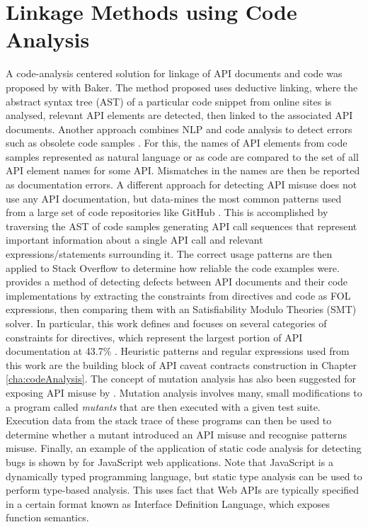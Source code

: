 \section{Linkage Methods using Code Analysis}
\label{sec:related-static-code-analysis}
A code-analysis centered solution for linkage of API documents and code was proposed by \cite{live-api-doc} with Baker. The method proposed uses deductive linking, where the abstract syntax tree (AST) of a particular code snippet from online sites is analysed, relevant API elements are detected, then linked to the associated API documents. Another approach combines NLP and code analysis to detect errors such as obsolete code samples \cite{zhong2013detecting}. For this, the names of API elements from code samples represented as natural language or as code are compared to the set of all API element names for some API. Mismatches in the names are then be reported as documentation errors. A different approach for detecting API misuse does not use any API documentation, but data-mines the most common patterns used from a large set of code repositories like GitHub \cite{code-examples}. This is accomplished by traversing the AST of code samples generating API call sequences that represent important information about a single API call and relevant expressions/statements surrounding it. The correct usage patterns are then applied to Stack Overflow to determine how reliable the code examples were. \cite{zhou-directive} provides a method of detecting defects between API documents and their code implementations by extracting the constraints from directives and code as FOL expressions, then comparing them with an Satisfiability Modulo Theories (SMT) solver. In particular, this work defines and focuses on several categories of constraints for directives, which represent the largest portion of API documentation at 43.7\% \cite{monperrus2012should}. Heuristic patterns and regular expressions used from this work are the building block of API caveat contracts construction in Chapter \ref{cha:codeAnalysis}.
The concept of mutation analysis has also been suggested for exposing API misuse by \cite{mutation-analysis}. Mutation analysis involves many, small modifications to a program called \textit{mutants} that are then executed with a given test suite. Execution data from the stack trace of these programs can then be used to determine whether a mutant introduced an API misuse and recognise patterns misuse. Finally, an example of the application of static code analysis for detecting bugs is shown by \cite{bae2014safewapi} for JavaScript web applications. Note that JavaScript is a dynamically typed programming language, but static type analysis can be used to perform type-based analysis. This uses fact that Web APIs are typically specified in a certain format known as Interface Definition Language, which exposes function semantics.

